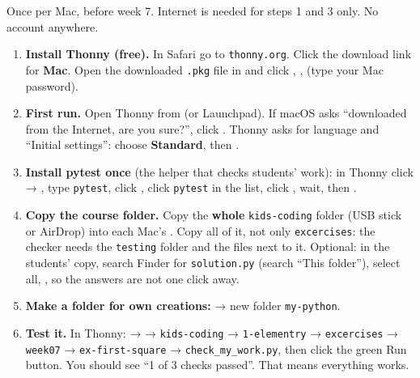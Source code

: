 \begin{teachernote}
Once per Mac, before week 7. Internet is needed for steps 1 and 3 only. No account anywhere.
\begin{enumerate}[leftmargin=1.4em,itemsep=1pt]
  \item \textbf{Install Thonny (free).} In Safari go to \texttt{thonny.org}. Click the download link for \textbf{Mac}. Open the downloaded \texttt{.pkg} file in  and click , ,  (type your Mac password).
  \item \textbf{First run.} Open Thonny from  (or Launchpad). If macOS asks \enquote{downloaded from the Internet, are you sure?}, click . Thonny asks for language and \enquote{Initial settings}: choose \textbf{Standard}, then .
  \item \textbf{Install pytest once} (the helper that checks students' work): in Thonny click  → , type \texttt{pytest}, click , click \texttt{pytest} in the list, click , wait, then .
  \item \textbf{Copy the course folder.} Copy the \textbf{whole} \texttt{kids-coding} folder (USB stick or AirDrop) into each Mac's . Copy all of it, not only \texttt{excercises}: the checker needs the \texttt{testing} folder and the files next to it. Optional: in the students' copy, search Finder for \texttt{solution.py} (search \enquote{This folder}), select all, , so the answers are not one click away.
  \item \textbf{Make a folder for own creations:}  → new folder \texttt{my-python}.
  \item \textbf{Test it.} In Thonny:  →  → \texttt{kids-coding} → \texttt{1-elementry} → \texttt{excercises} → \texttt{week07} → \texttt{ex-first-square} → \texttt{check\_my\_work.py}, then click the green Run button. You should see \enquote{1 of 3 checks passed}. That means everything works.
\end{enumerate}
\end{teachernote}

